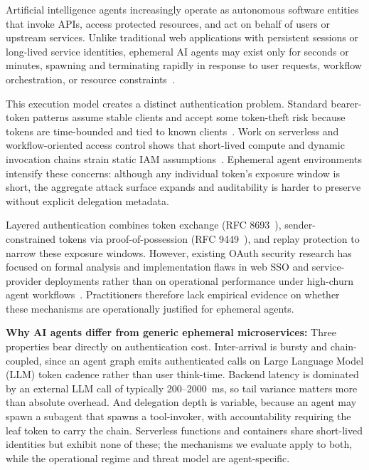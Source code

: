 \documentclass[conference]{IEEEtran}
\begin{document}
Artificial intelligence agents increasingly operate as autonomous software entities that invoke APIs, access protected resources, and act on behalf of users or upstream services. Unlike traditional web applications with persistent sessions or long-lived service identities, ephemeral AI agents may exist only for seconds or minutes, spawning and terminating rapidly in response to user requests, workflow orchestration, or resource constraints~\cite{authenticated_delegation_agents}.

This execution model creates a distinct authentication problem. Standard bearer-token patterns assume stable clients and accept some token-theft risk because tokens are time-bounded and tied to known clients~\cite{rfc6750,rfc9700}. Work on serverless and workflow-oriented access control shows that short-lived compute and dynamic invocation chains strain static IAM assumptions~\cite{sankaran2020,marin2022serverless}. Ephemeral agent environments intensify these concerns: although any individual token's exposure window is short, the aggregate attack surface expands and auditability is harder to preserve without explicit delegation metadata.

Layered authentication combines token exchange (RFC 8693~\cite{rfc8693}), sender-constrained tokens via proof-of-possession (RFC 9449~\cite{rfc9449}), and replay protection to narrow these exposure windows. However, existing OAuth security research has focused on formal analysis and implementation flaws in web SSO and service-provider deployments rather than on operational performance under high-churn agent workflows~\cite{oauth_formal,rahat2022cerberus}. Practitioners therefore lack empirical evidence on whether these mechanisms are operationally justified for ephemeral agents.

\textbf{Why AI agents differ from generic ephemeral microservices:} Three properties bear directly on authentication cost. Inter-arrival is bursty and chain-coupled, since an agent graph emits authenticated calls on Large Language Model (LLM) token cadence rather than user think-time. Backend latency is dominated by an external LLM call of typically 200--2000~ms, so tail variance matters more than absolute overhead. And delegation depth is variable, because an agent may spawn a subagent that spawns a tool-invoker, with accountability requiring the leaf token to carry the chain. Serverless functions and containers share short-lived identities but exhibit none of these; the mechanisms we evaluate apply to both, while the operational regime and threat model are agent-specific.
\end{document}
